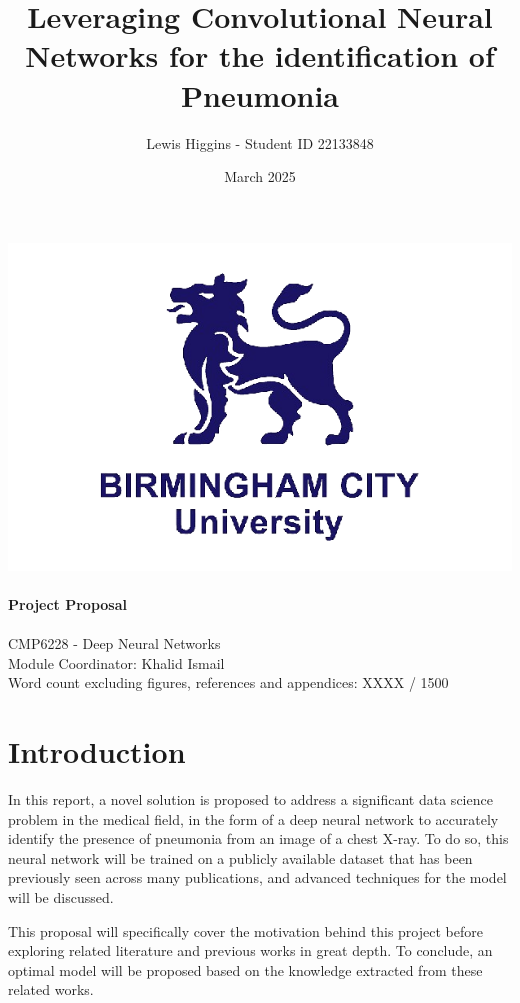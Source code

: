 \documentclass[12pt]{report}
\title{Leveraging Convolutional Neural Networks for the identification of Pneumonia}
\author{Lewis Higgins - Student ID 22133848}
\date{March 2025}
\newcommand{\para}{\vspace{7pt}\noindent}
\begin{document}
\makeatletter
\begin{titlepage}
    \begin{center}
        \includegraphics[width=0.7\linewidth]{BCU}\\[4ex]
        {\huge \bfseries \@title}\\[2ex]
        {\large \bfseries  Project Proposal}\\[50ex]
        {\@author}\\[2ex]
        {CMP6228 - Deep Neural Networks}\\[2ex]
        {Module Coordinator: Khalid Ismail}\\[2ex]
        {Word count excluding figures, references and appendices: XXXX / 1500}\\[10ex]
    \end{center}
\end{titlepage}
\makeatother
\thispagestyle{empty}
\newpage

\setcounter{page}{0}

\tableofcontents
\thispagestyle{empty}

\chapter*{Introduction}

In this report, a novel solution is proposed to address a significant data science problem in the medical field, in the form of 
a deep neural network to accurately identify the presence of pneumonia from an image of a chest X-ray. To do so, this neural network 
will be trained on a publicly available dataset that has been previously seen across many publications, and advanced techniques 
for the model will be discussed.

\para This proposal will specifically cover the motivation behind this project before exploring related literature and previous works 
in great depth. To conclude, an optimal model will be proposed based on the knowledge extracted from these related works. 
\end{document}
